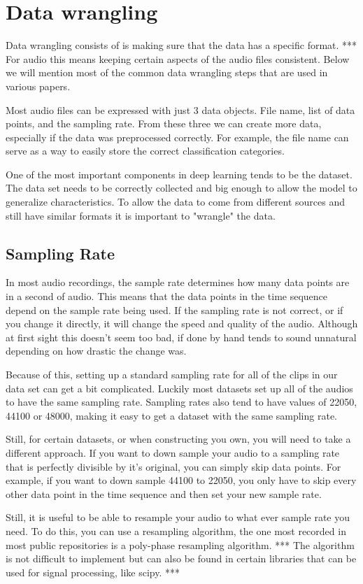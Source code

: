 \documentclass{book}
\begin{document}
\section{Data wrangling}
\qquad Data wrangling consists of is making sure that the data has a specific format. *** %
For audio this means keeping certain aspects of the audio files consistent.
Below we will mention most of the common data wrangling steps that are used in various papers.
\par
Most audio files can be expressed with just 3 data objects. File name, list of data points, and the sampling rate.
From these three we can create more data, especially if the data was preprocessed correctly.
For example, the file name can serve as a way to easily store the correct classification categories.
\par
One of the most important components in deep learning tends to be the dataset.
The data set needs to be correctly collected and big enough to allow the model to generalize characteristics.
To allow the data to come from different sources and still have similar formats it is important to "wrangle" the data.
\subsection{Sampling Rate}
\qquad In most audio recordings, the sample rate determines how many data points are in a second of audio.
This means that the data points in the time sequence depend on the sample rate being used.
If the sampling rate is not correct, or if you change it directly, it will change the speed and quality of the audio.
Although at first sight this doesn't seem too bad, if done by hand tends to sound unnatural depending on how drastic the change was.
\par
Because of this, setting up a standard sampling rate for all of the clips in our data set can get a bit complicated.
Luckily most datasets set up all of the audios to have the same sampling rate.
Sampling rates also tend to have values of 22050, 44100 or 48000, making it easy to get a dataset with the same sampling rate.
\par
Still, for certain datasets, or when constructing you own, you will need to take a different approach.
If you want to down sample your audio to a sampling rate that is perfectly divisible by it's original, you can simply skip data points.
For example, if you want to down sample 44100 to 22050, you only have to skip every other data point in the time sequence and then set your new sample rate.
\par
Still, it is useful to be able to resample your audio to what ever sample rate you need.
To do this, you can use a resampling algorithm, the one most recorded in most public repositories is a poly-phase resampling algorithm. *** %
The algorithm is not difficult to implement but can also be found in certain libraries that can be used for signal processing, like scipy. *** %
\end{document}
